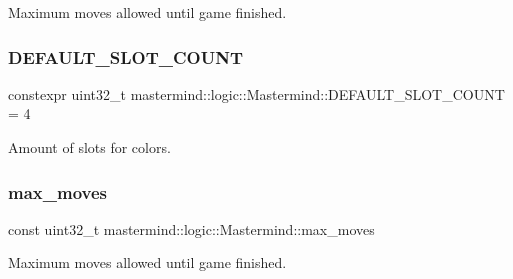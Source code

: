 Maximum moves allowed until game finished. 

\hypertarget{classmastermind_1_1logic_1_1_mastermind_a27d7dbfa1b75744f4b8378e7faaec0af}{}\label{classmastermind_1_1logic_1_1_mastermind_a27d7dbfa1b75744f4b8378e7faaec0af} 
\subsubsection{\texorpdfstring{D\+E\+F\+A\+U\+L\+T\+\_\+\+S\+L\+O\+T\+\_\+\+C\+O\+U\+NT}{DEFAULT\_SLOT\_COUNT}}
{\footnotesize\ttfamily constexpr uint32\+\_\+t mastermind\+::logic\+::\+Mastermind\+::\+D\+E\+F\+A\+U\+L\+T\+\_\+\+S\+L\+O\+T\+\_\+\+C\+O\+U\+NT = 4\hspace{0.3cm}{\ttfamily [static]}}



Amount of slots for colors. 

\hypertarget{classmastermind_1_1logic_1_1_mastermind_ac25c65d6c3b258154b632e5edb77fdb7}{}\label{classmastermind_1_1logic_1_1_mastermind_ac25c65d6c3b258154b632e5edb77fdb7} 
\subsubsection{\texorpdfstring{max\+\_\+moves}{max\_moves}}
{\footnotesize\ttfamily const uint32\+\_\+t mastermind\+::logic\+::\+Mastermind\+::max\+\_\+moves\hspace{0.3cm}{\ttfamily [private]}}



Maximum moves allowed until game finished. 

\hypertarget{classmastermind_1_1logic_1_1_mastermind_a19f901a04d6175f6437b89cd3600c338}{}\label{classmastermind_1_1logic_1_1_mastermind_a19f901a04d6175f6437b89cd3600c338} 
